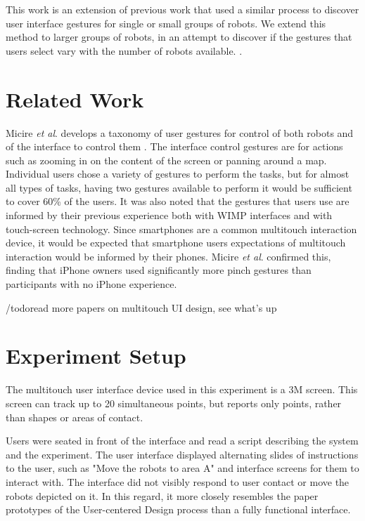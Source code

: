 \documentclass[]{article}
\begin{document}
This work is an extension of previous work that used a similar process to discover user interface gestures for single or small groups of robots. We extend this method to larger groups of robots, in an attempt to discover if the gestures that users select vary with the number of robots available. . 

\section{Related Work}

Micire \textit{et al}. develops a taxonomy of user gestures for control of both robots and of the interface to control them \cite{Micire:2009:ANG:1731903.1731912}. 
The interface control gestures are for actions such as zooming in on the content of the screen or panning around a map. 
Individual users chose a variety of gestures to perform the tasks, but for almost all types of tasks, having two gestures available to perform it would be sufficient to cover 60\% of the users. 
It was also noted that the gestures that users use are informed by their previous experience both with WIMP interfaces and with touch-screen technology. 
Since smartphones are a common multitouch interaction device, it would be expected that smartphone users expectations of multitouch interaction would be informed by their phones. 
Micire \textit{et al}. confirmed this, finding that iPhone owners used significantly more pinch gestures than participants with no iPhone experience. 

/todo{read more papers on multitouch UI design, see what's up}

\section{Experiment Setup}


The multitouch user interface device used in this experiment is a 3M  screen. 
This screen can track up to 20 simultaneous points, but reports only points, rather than shapes or areas of contact. 

Users were seated in front of the interface and read a script describing the system and the experiment. The user interface displayed alternating slides of instructions to the user, such as "Move the robots to area A" and interface screens for them to interact with. 
The interface did not visibly respond to user contact or move the robots depicted on it.
In this regard, it more closely resembles the paper prototypes of the User-centered Design process  than a fully functional interface.
\end{document}
